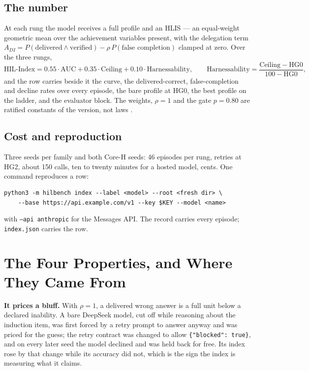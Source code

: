 \subsection{The number}

At each rung the model receives a full profile and an HLIS --- an equal-weight geometric mean over the achievement variables present, with the delegation term $A_{DI} = P(\text{delivered} \wedge \text{verified}) - \rho\,P(\text{false completion})$ clamped at zero. Over the three rungs,
\[
\text{HIL-Index} = 0.55\cdot\mathrm{AUC} + 0.35\cdot\mathrm{Ceiling} + 0.10\cdot\mathrm{Harnessability},
\qquad \mathrm{Harnessability} = \frac{\mathrm{Ceiling} - \mathrm{HG0}}{100 - \mathrm{HG0}},
\]
and the row carries beside it the curve, the delivered-correct, false-completion and decline rates over every episode, the bare profile at HG0, the best profile on the ladder, and the evaluator block. The weights, $\rho = 1$ and the gate $p = 0.80$ are ratified constants of the version, not laws \citep{yang2026unified}.

\subsection{Cost and reproduction}

Three seeds per family and both Core-H seeds: 46 episodes per rung, retries at HG2, about 150 calls, ten to twenty minutes for a hosted model, cents. One command reproduces a row:
\begin{verbatim}
python3 -m hilbench index --label <model> --root <fresh dir> \
    --base https://api.example.com/v1 --key $KEY --model <name>
\end{verbatim}
with \texttt{--api anthropic} for the Messages API. The record carries every episode; \texttt{index.json} carries the row.

\section{The Four Properties, and Where They Came From}\label{sec:properties}

\textbf{It prices a bluff.} With $\rho = 1$, a delivered wrong answer is a full unit below a declared inability. A bare DeepSeek model, cut off while reasoning about the induction item, was first forced by a retry prompt to answer anyway and was priced for the guess; the retry contract was changed to allow \texttt{\{"blocked": true\}}, and on every later seed the model declined and was held back for free. Its index rose by that change while its accuracy did not, which is the sign the index is measuring what it claims.

